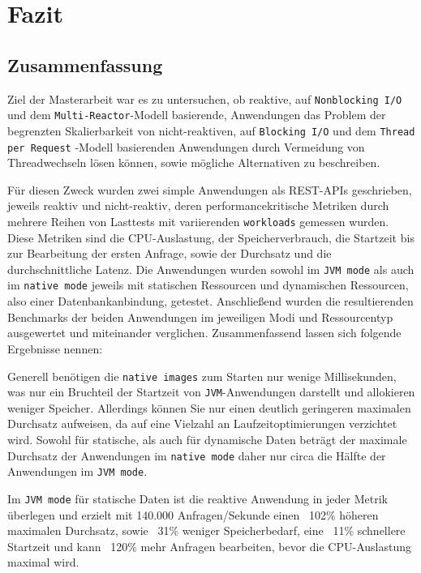\section{Fazit}
\label{sec:fazit}

\subsection{Zusammenfassung}
\label{subsec:zusammenfassung}
Ziel der Masterarbeit war es zu untersuchen, ob reaktive, auf \verb|Nonblocking I/O| und dem \verb|Multi-Reactor|-Modell basierende,
Anwendungen das Problem der begrenzten Skalierbarkeit von nicht-reaktiven, auf \verb|Blocking I/O| und dem \verb|Thread per Request|
-Modell basierenden Anwendungen durch Vermeidung von Threadwechseln lösen können, sowie mögliche Alternativen zu beschreiben.

Für diesen Zweck wurden zwei simple Anwendungen als REST-APIs geschrieben, jeweils reaktiv und nicht-reaktiv, deren
performancekritische Metriken durch mehrere Reihen von Lasttests mit variierenden \verb|workloads| gemessen wurden.
Diese Metriken sind die CPU-Auslastung, der Speicherverbrauch, die Startzeit bis zur Bearbeitung der ersten Anfrage,
sowie der Durchsatz und die durchschnittliche Latenz.
Die Anwendungen wurden sowohl im \verb|JVM mode| als auch im \verb|native mode| jeweils mit statischen Ressourcen und dynamischen
Ressourcen, also einer Datenbankanbindung, getestet.
Anschließend wurden die resultierenden Benchmarks der beiden Anwendungen im jeweiligen Modi und Ressourcentyp ausgewertet und
miteinander verglichen.
\newline
Zusammenfassend lassen sich folgende Ergebnisse nennen:\newline

Generell benötigen die \verb|native images| zum Starten nur wenige Millisekunden, was nur ein Bruchteil der Startzeit
von \verb|JVM|-Anwendungen darstellt und allokieren weniger Speicher. Allerdings können Sie nur einen deutlich
geringeren maximalen Durchsatz aufweisen, da auf eine Vielzahl an Laufzeitoptimierungen verzichtet wird.
Sowohl für statische, als auch für dynamische Daten beträgt der maximale Durchsatz der Anwendungen im \verb|native mode|
daher nur circa die Hälfte der Anwendungen im \verb|JVM mode|.

Im \verb|JVM mode| für statische Daten ist die reaktive Anwendung in jeder Metrik überlegen und erzielt mit 140.000 Anfragen/Sekunde
einen ~102\% höheren maximalen Durchsatz, sowie ~31\% weniger Speicherbedarf, eine ~11\% schnellere Startzeit und kann ~120\%
mehr Anfragen bearbeiten, bevor die CPU-Auslastung maximal wird.

